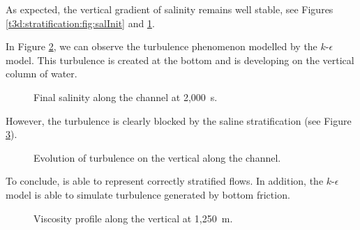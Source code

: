 \bigskip
As expected, the vertical gradient of salinity remains well stable, see Figures
\ref{t3d:stratification:fig:salInit} and \ref{t3d:stratification:fig:sal2000}.

\bigskip
In Figure \ref{t3d:stratification:fig:evolTurb}, we can observe 
the turbulence phenomenon modelled by the $k$-$\epsilon$ model.
This turbulence is created at the bottom and is developing on the
vertical column of water.
\begin{figure}[!htbp]
 \centering
 \caption{Final salinity along the channel at 2,000~s.}
 \label{t3d:stratification:fig:sal2000}
\end{figure}

However, the turbulence is clearly blocked by the saline stratification 
(see Figure \ref{t3d:stratification:fig:visco}).

\begin{figure}[!htbp]
 \centering
 \caption{Evolution of turbulence on the vertical along the channel.}
 \label{t3d:stratification:fig:evolTurb}
\end{figure}


\bigskip
To conclude,  is able to represent correctly stratified flows.
In addition, the $k$-$\epsilon$ model is able to simulate turbulence
generated by bottom friction.

\begin{figure}[!htbp]
 \centering
 \caption{Viscosity profile along the vertical at 1,250~m.}
 \label{t3d:stratification:fig:visco}
\end{figure}
